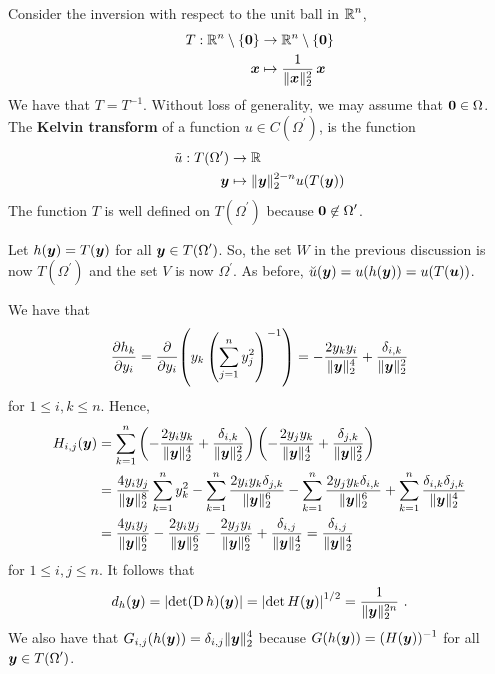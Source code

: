 Consider the inversion with respect to the unit ball in $\displaystyle \RR^n$,
\begin{align*}
T:\RR^n \setminus \{\VEC{0}\} & \rightarrow \RR^n \setminus \{\VEC{0}\} \\
\VEC{x} & \mapsto \frac{1}{\|\VEC{x}\|_2^2} \, \VEC{x}
\end{align*}
We have that $\displaystyle T=T^{-1}$.  Without loss of generality, we
may assume that $\VEC{0} \in \Omega$.  The
{\bfseries Kelvin transform} of a
function $\displaystyle u\in C(\Omega^{\prime})$, is the function
\begin{align*}
\tilde{u}: T(\Omega^{\prime}) & \rightarrow \RR \\
\VEC{y} & \mapsto \|\VEC{y}\|_2^{2-n} u(T(\VEC{y}))
\end{align*}
The function $T$ is well defined on $\displaystyle T(\Omega^{\prime})$ because
$\displaystyle \VEC{0} \not\in \Omega^{\prime}$.

Let $h(\VEC{y}) = T(\VEC{y})$ for all
$\displaystyle \VEC{y} \in T(\Omega^{\prime})$.
So, the set $W$ in the previous discussion is now
$\displaystyle T(\Omega^{\prime})$ and
the set $V$ is now $\displaystyle \Omega^{\prime}$.  As before,
$\breve{u}(\VEC{y}) = u(h(\VEC{y})) = u(T(\VEC{u}))$.

We have that
\[
\pdydx{h_k}{y_i} = \pdfdx{\left( y_k \left( \sum_{j=1}^n y_j^2
\right)^{-1} \right)}{y_i}
= -\frac{2 y_k y_i}{\|\VEC{y}\|_2^4} + \frac{\delta_{i,k}}{\|\VEC{y}\|_2^2}
\]
for $1 \leq i, k \leq n$.  Hence,
\begin{align*}
H_{i,j}(\VEC{y}) &= \sum_{k=1}^n \left( -\frac{2 y_i y_k}{\|\VEC{y}\|_2^4} +
  \frac{\delta_{i,k}}{\|\VEC{y}\|_2^2} \right)
\left( -\frac{2 y_j y_k}{\|\VEC{y}\|_2^4} +
  \frac{\delta_{j,k}}{\|\VEC{y}\|_2^2} \right) \\
&= \frac{4 y_iy_j}{\|\VEC{y}\|_2^8} \sum_{k=1}^n y_k^2
- \sum_{k=1}^n \frac{2 y_i y_k \delta_{j,k}}{\|\VEC{y}\|_2^6}
- \sum_{k=1}^n \frac{2 y_j y_k \delta_{i,k}}{\|\VEC{y}\|_2^6}
+ \sum_{k=1}^n \frac{ \delta_{i,k}\delta_{j,k}}{\|\VEC{y}\|_2^4} \\
&= \frac{4 y_iy_j}{\|\VEC{y}\|_2^6}
- \frac{2 y_i y_j}{\|\VEC{y}\|_2^6}
- \frac{2 y_j y_i}{\|\VEC{y}\|_2^6}
+ \frac{ \delta_{i,j}}{\|\VEC{y}\|_2^4}
= \frac{ \delta_{i,j}}{\|\VEC{y}\|_2^4}
\end{align*}
for $1 \leq i,j \leq n$.  It follows that
\[
d_h(\VEC{y}) = \left| \det (\diff h)(\VEC{y}) \right|
= \left| \det H(\VEC{y}) \right|^{1/2}
= \frac{1}{\|\VEC{y}\|_2^{2n}} \ .
\]
We also have that
$\displaystyle G_{i,j}(h(\VEC{y})) = \delta_{i,j} \|\VEC{y}\|_2^4$
because $\displaystyle G(h(\VEC{y})) = (H(\VEC{y}))^{-1}$ for all
$\displaystyle \VEC{y} \in T(\Omega^{\prime})$.

